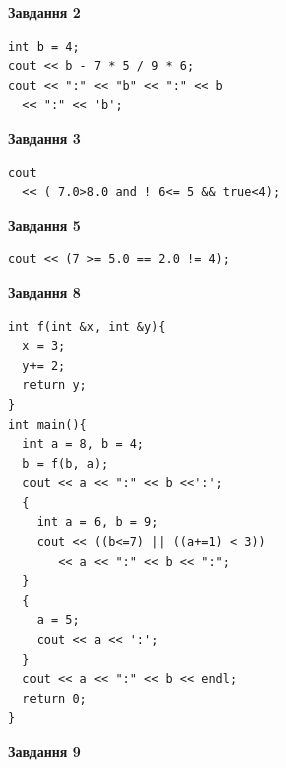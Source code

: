 \documentclass[12pt, ukrainian]{article}
\begin{document}
{\begin {large}
\begin{minipage}[t]{7.0cm}
\end{minipage}
\vline \hspace{1mm}
\begin{minipage}[t]{11.0cm}

\begin{center}
\textbf{Завдання 2}
\end{center}
\vspace{-8mm}

\begin{verbatim}
int b = 4;
cout << b - 7 * 5 / 9 * 6;
cout << ":" << "b" << ":" << b 
  << ":" << 'b';
\end{verbatim}



\begin{center}
\textbf{Завдання 3}
\end{center}
\vspace{-8mm}

\begin{verbatim}
cout 
  << ( 7.0>8.0 and ! 6<= 5 && true<4);
\end{verbatim}



\begin{center}
\textbf{Завдання 5}
\end{center}
\vspace{-8mm}

\begin{verbatim}
cout << (7 >= 5.0 == 2.0 != 4);
\end{verbatim}



\begin{center}
\textbf{Завдання 8}
\end{center}
\vspace{-8mm}

\begin{verbatim}
int f(int &x, int &y){
  x = 3;
  y+= 2;
  return y;
}
int main(){
  int a = 8, b = 4;
  b = f(b, a);
  cout << a << ":" << b <<':';
  {
    int a = 6, b = 9;
    cout << ((b<=7) || ((a+=1) < 3))
       << a << ":" << b << ":";
  }
  {
    a = 5;
    cout << a << ':';
  }
  cout << a << ":" << b << endl;
  return 0;
}
\end{verbatim}

\end{minipage}


\begin{minipage}[t]{7.0cm}

\begin{center}
\textbf{Завдання 9}
\end{center}
\vspace{-8mm}


\end{minipage}
\end{large}}
\end{document}
